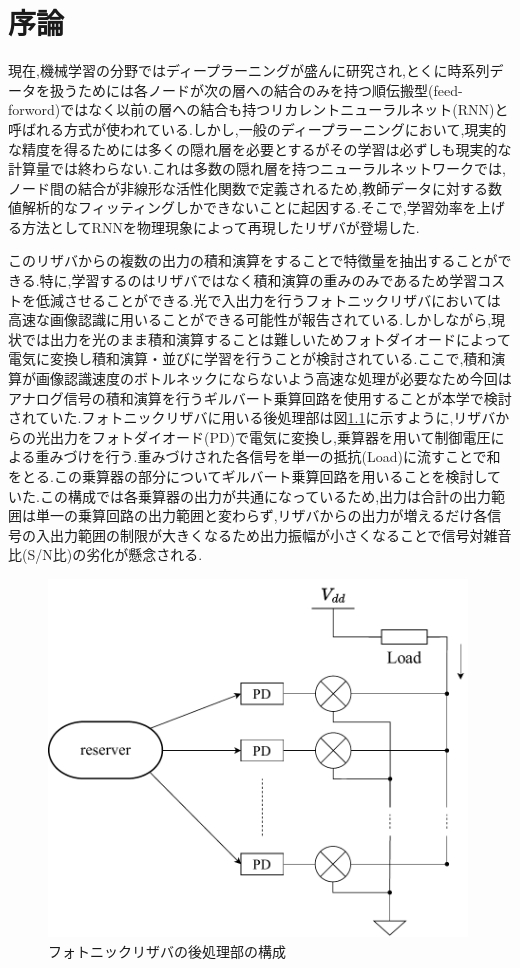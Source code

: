 \chapter{序論}
現在,機械学習の分野ではディープラーニングが盛んに研究され,とくに時系列データを扱うためには各ノードが次の層への結合のみを持つ順伝搬型(feed-forword)ではなく以前の層への結合も持つリカレントニューラルネット(RNN)と呼ばれる方式が使われている.しかし,一般のディープラーニングにおいて,現実的な精度を得るためには多くの隠れ層を必要とするがその学習は必ずしも現実的な計算量では終わらない.これは多数の隠れ層を持つニューラルネットワークでは,ノード間の結合が非線形な活性化関数で定義されるため,教師データに対する数値解析的なフィッティングしかできないことに起因する.そこで,学習効率を上げる方法としてRNNを物理現象によって再現したリザバが登場した.\par
このリザバからの複数の出力の積和演算をすることで特徴量を抽出することができる.特に,学習するのはリザバではなく積和演算の重みのみであるため学習コストを低減させることができる.光で入出力を行うフォトニックリザバにおいては高速な画像認識に用いることができる可能性が報告されている.しかしながら,現状では出力を光のまま積和演算することは難しいためフォトダイオードによって電気に変換し積和演算・並びに学習を行うことが検討されている.ここで,積和演算が画像認識速度のボトルネックにならないよう高速な処理が必要なため今回はアナログ信号の積和演算を行うギルバート乗算回路を使用することが本学で検討されていた.フォトニックリザバに用いる後処理部は図\ref{fig:1_config}に示すように,リザバからの光出力をフォトダイオード(PD)で電気に変換し,乗算器を用いて制御電圧による重みづけを行う.重みづけされた各信号を単一の抵抗(Load)に流すことで和をとる.この乗算器の部分についてギルバート乗算回路を用いることを検討していた.この構成では各乗算器の出力が共通になっているため,出力は合計の出力範囲は単一の乗算回路の出力範囲と変わらず,リザバからの出力が増えるだけ各信号の入出力範囲の制限が大きくなるため出力振幅が小さくなることで信号対雑音比(S/N比)の劣化が懸念される.
\begin{figure}
        \begin{center}
        \includegraphics[width=0.99\textwidth]{figures/chapter1/config.pdf}
        \caption{フォトニックリザバの後処理部の構成}
        \label{fig:1_config}
    \end{center}
\end{figure}
